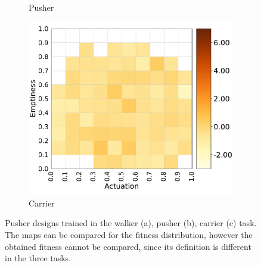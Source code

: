 \begin{figure}
\begin{subfigure}[b]{0.3\textwidth}
         \caption{Pusher}
         \label{pusher_b}
    \end{subfigure}
    \hfill
    \begin{subfigure}[b]{0.3\textwidth}
         \centering
         \includegraphics[scale=0.3]{images/multitasking/pusher_c.pdf}
         \caption{Carrier}
         \label{pusher_c}
    \end{subfigure}
    \caption{Pusher designs trained in the walker (a), pusher (b), carrier (c) task.
    The maps can be compared for the fitness distribution, however the obtained fitness cannot be compared, since its definition is different in the three tasks.}
    \label{fig:pusher_multitask}
\end{figure}

